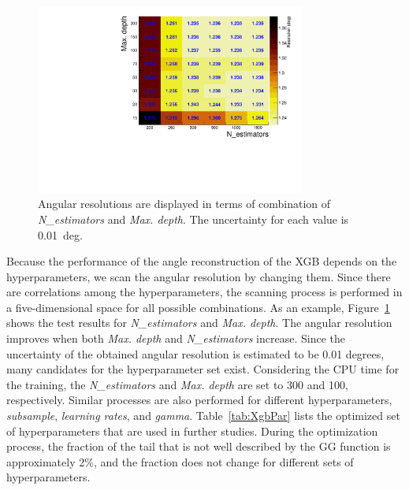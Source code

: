 \documentclass[12pt,times,draftclsnofoot,a4paper]{elsarticle}
\begin{document}
\begin{figure}[!hbt]
\centering
\includegraphics[width=0.79\textwidth]{Fig4_include_ne250.pdf}
\caption{Angular resolutions are displayed in terms of combination of \textit{N\_estimators} and \textit{Max. depth}. The uncertainty for each value is 0.01~deg. }
\label{fig:par_scan}
\end{figure}

Because the performance of the angle reconstruction of the XGB depends on the hyperparameters, we scan the angular resolution by changing them. Since there are correlations among the hyperparameters, the scanning process is performed in a five-dimensional space for all possible combinations. As an example, Figure~\ref{fig:par_scan} shows the test results for \textit{N\_estimators} and \textit{Max. depth}. The angular resolution improves when both \textit{Max. depth} and \textit{N\_estimators} increase. Since the uncertainty of the obtained angular resolution is estimated to be 0.01 degrees, many candidates for the hyperparameter set exist. Considering the CPU time for the training, the \textit{N\_estimators} and \textit{Max. depth} are set to 300 and 100, respectively. Similar processes are also performed for different hyperparameters, \textit{subsample}, \textit{learning rates}, and \textit{gamma}. Table~\ref{tab:XgbPar} lists the optimized set of hyperparameters that are used in further studies. During the optimization process, the fraction of the tail that is not well described by the GG function is approximately 2\%, and the fraction does not change for different sets of hyperparameters.
\end{document}
